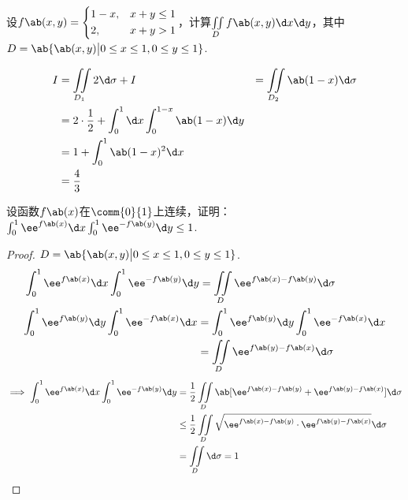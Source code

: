 \begin{exercise}
    设$f\ab(x,y)=\left\{
        \begin{aligned}
            &1-x,&&x+y\le 1\\
            &2,&&x+y>1
        \end{aligned}
    \right.$，计算$\iint\limits_D{f\ab(x,y)\d x\d y}$，其中$D=\ab{\ab(x,y)\big|0\le x\le 1,0\le y\le 1}$.
\end{exercise}
\begin{solution}
    $$
    \begin{aligned}
        I&=\iint\limits_{D_1}{2\d\sigma}+I&=\iint\limits_{D_2}{\ab(1-x)\d\sigma}\\
        &=2\cdot\frac{1}{2}+\int_0^1{\d x}\int_0^{1-x}{\ab(1-x)\d y}\\
        &=1+\int_0^1{\ab(1-x)^2\d x}\\
        &=\frac{4}{3}
    \end{aligned}
    $$
\end{solution}

\begin{exercise}
    设函数$f\ab(x)$在$\comm{0}{1}$上连续，证明：$\int_0^1{\ee^{f\ab(x)}\d x}\int_0^1{\ee^{-f\ab(y)}\d y}\le 1$.
\end{exercise}
\begin{proof}
    $D=\ab{\ab(x,y)\big|0\le x\le 1,0\le y\le 1}$.
    $$
    \begin{aligned}
        &\int_0^1{\ee^{f\ab(x)}\d x}\int_0^1{\ee^{-f\ab(y)}\d y}=\iint\limits_D{\ee^{f\ab(x)-f\ab(y)}\d\sigma}\\
        &\begin{aligned}
            \int_0^1{\ee^{f\ab(y)}\d y}\int_0^1{\ee^{-f\ab(x)}\d x}&=\int_0^1{\ee^{f\ab(y)}\d y}\int_0^1{\ee^{-f\ab(x)}\d x}\\
            &=\iint\limits_D{\ee^{f\ab(y)-f\ab(x)}\d\sigma}
        \end{aligned}
    \end{aligned}
    $$
    $$
    \begin{aligned}
    \implies\int_0^1{\ee^{f\ab(x)}\d x}\int_0^1{\ee^{-f\ab(y)}\d y}&=\frac{1}{2}\iint\limits_D{\ab[\ee^{f\ab(x)-f\ab(y)}+\ee^{f\ab(y)-f\ab(x)}]\d\sigma}\\
    &\le\frac{1}{2}\iint\limits_D{\sqrt{\ee^{f\ab(x)-f\ab(y)}\cdot\ee^{f\ab(y)-f\ab(x)}}\d\sigma}\\
    &=\iint\limits_D{\d\sigma}=1
\end{aligned}
    $$
\end{proof}
